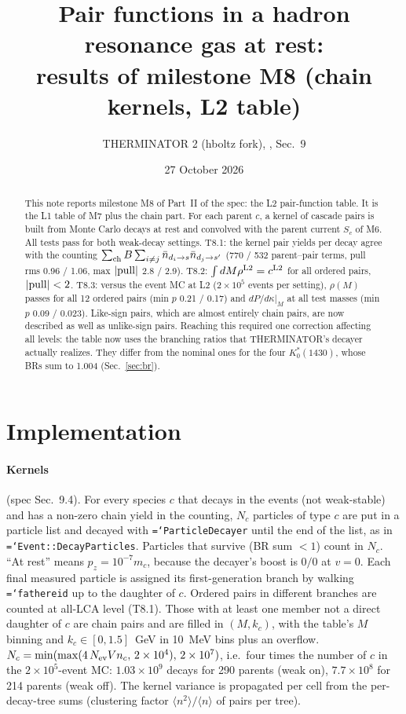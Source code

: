 \documentclass[11pt,a4paper]{article}
\title{Pair functions in a hadron resonance gas at rest:\\ results of milestone M8 (chain kernels, L2 table)}
\author{THERMINATOR 2 (hboltz fork), \code{src/work/hrg\_pair\_density\_spec.md}, Sec.~9}
\date{27 October 2026}
\newcommand{\code}[1]{\texttt{\hyphenchar\font=`\-#1}}
\begin{document}
\maketitle

\begin{abstract}
\noindent
This note reports milestone M8 of Part~II of the spec: the L2 pair-function table. It is the L1
table of M7 plus the chain part. For each parent $c$, a kernel of cascade pairs is built from Monte
Carlo decays at rest and convolved with the parent current $S_c$ of M6. All tests pass for both
weak-decay settings. T8.1: the kernel pair yields per decay agree with the counting
$\sum_{\rm ch}B\sum_{i\ne j}\bar n_{d_i\to s}\bar n_{d_j\to s'}$ (770 / 532 parent--pair terms, pull rms
0.96 / 1.06, max $|{\rm pull}|$ 2.8 / 2.9). T8.2: $\int dM\rho^{\rm L2}=c^{\rm L2}$ for all ordered
pairs, $|{\rm pull}|<2$. T8.3: versus the event MC at L2 ($2\times10^5$ events per setting),
$\rho(M)$ passes for all 12 ordered pairs (min $p$ 0.21 / 0.17) and $dP/d\kappa|_M$ at all test
masses (min $p$ 0.09 / 0.023). Like-sign pairs, which are almost entirely chain pairs, are now
described as well as unlike-sign pairs. Reaching this required one correction affecting all levels:
the table now uses the branching ratios that THERMINATOR's decayer actually realizes. They differ
from the nominal ones for the four $K^*_0(1430)$, whose BRs sum to 1.004
(Sec.~\ref{sec:br}).
\end{abstract}

\section{Implementation}
\paragraph{Kernels} (spec Sec.~9.4). For every species $c$ that decays in the events (not weak-stable)
and has a non-zero chain yield in the counting, $N_c$ particles of type $c$ are put in a particle list
and decayed with \code{ParticleDecayer} until the end of the list, as in
\code{Event::DecayParticles}. Particles that survive (BR sum $<1$) count in $N_c$. ``At rest''
means $p_z=10^{-7}m_c$, because the decayer's boost is $0/0$ at $v=0$. Each final measured particle
is assigned its first-generation branch by walking \code{fathereid} up to the daughter of $c$.
Ordered pairs in different branches are counted at all-LCA level (T8.1). Those with at least one
member not a direct daughter of $c$ are chain pairs and are filled in $(M,k_c)$, with the table's
$M$ binning and $k_c\in[0,1.5]$~GeV in 10~MeV bins plus an overflow.
$N_c=\min(\max(4\,N_{\rm ev}Vn_c,\,2\times10^4),\,2\times10^7)$, i.e.\ four times the number of $c$
in the $2\times10^5$-event MC: $1.03\times10^9$ decays for 290 parents (weak on), $7.7\times10^8$
for 214 parents (weak off). The kernel variance is propagated per cell from the per-decay-tree sums
(clustering factor $\langle n^2\rangle/\langle n\rangle$ of pairs per tree).
\end{document}
